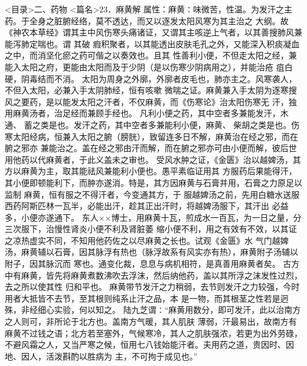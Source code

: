 \documentclass[a4paper,12pt,UTF8,twoside]{ctexbook}
\begin{document}
<目录>二、药物
<篇名>23．麻黄解
属性：麻黄∶味微苦，性温。为发汗之主药。于全身之脏腑经络，莫不透达，而又以逐发太阳风寒为其主治之 
大纲。故《神农本草经》谓其主中风伤寒头痛诸证，又谓其主咳逆上气者，以其善搜肺风兼能泻肺定喘也。谓 
其破 瘕积聚者，以其能透出皮肤毛孔之外，又能深入积痰凝血之中，而消坚化瘀之药可偕之以奏效也。且其 
性善利小便，不但走太阳之经，兼能入太阳之府，更能由太阳而及于少阴（是以伤寒少阴病用之），并能治疮 
疽白硬，阴毒结而不消。 
太阳为周身之外廓，外廓者皮毛也，肺亦主之。风寒袭人，不但入太阳，必兼入手太阴肺经，恒有咳嗽 
微喘之证。麻黄兼入手太阴为逐寒搜风之要药，是以能发太阳之汗者，不仅麻黄，而《伤寒论》治太阳伤寒无 
汗，独用麻黄汤者，治足经而兼顾手经也。 
凡利小便之药，其中空者多兼能发汗，木通、 蓄之类是也。发汗之药，其中空者多兼能利小便，麻黄、 
柴胡之类是也。伤寒太阳经病，恒兼入太阳之腑（膀胱），致留连多日不解，麻黄治在经之邪，而在腑之邪亦 
兼能治之。盖在经之邪由汗而解，而在腑之邪亦可由小便而解，彼后世用他药以代麻黄者，于此义盖未之审也。 
受风水肿之证，《金匮》治以越婢汤，其方以麻黄为主，取其能祛风兼能利小便也。愚平素临证用其 
方服药后果能得汗，其小便即顿能利下，而肿亦遂消。特是，其方因麻黄与石膏并用，石膏之力原足以监制 
麻黄，恒有服之不得汗者，今变通其方，于 
服越婢汤之前，先用白糖水送服西药阿斯匹林一瓦半，必能出汗，趁其正出汗时，将越婢汤服下，其汗出 
必益多，小便亦遂通下。 
东人××博士，用麻黄十瓦，煎成水一百瓦，为一日之量，分三次服下，治慢性肾炎小便不利及肾脏萎 
缩小便不利，用之有效有不效，以其证之凉热虚实不同，不知用他药佐之以尽麻黄之长也。试观《金匮》水 
气门越婢汤，麻黄辅以石膏，因其脉浮有热也（脉浮故系有风实亦有热），麻黄附子汤辅以附子，因其脉沉而 
寒也。通变化裁，息息与病机相符，是真善用麻黄者矣。 
古方中有麻黄，皆先将麻黄煮数沸吹去浮沫，然后纳他药，盖以其所浮之沫发性过烈，去之所以使其性 
归和平也。 
麻黄带节发汗之力稍弱，去节则发汗之力较强，今时用者大抵皆不去节，至其根则纯系止汗之品，本 
是一物，而其根茎之性若是迥殊，非经细心实验，何以知之。 
陆九芝谓∶“麻黄用数分，即可发汗，此以治南方之人则可，非所论于北方也。盖南方气暖，其人肌肤 
薄弱，汗最易出，故南方有麻黄不过钱之语；北方若至塞外，气候寒冷，其人之肌肤强浓，若更为出外劳碌， 
不避风霜之人，又当严寒之候，恒用七八钱始能汗者。夫用药之道，贵因时、因地、因人，活泼斟酌以胜病为 
主，不可拘于成见也。” 
\end{document}
